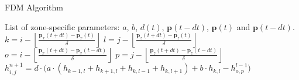 \begin{algorithm}
\caption{FDM Algorithm}
\label{alg:fdm_compute}
\begin{algorithmic}[1]
\Require List of zone-specific parameters: $a$, $b$, $d(t)$, $\mathbf{p}(t-dt)$, $\mathbf{p}(t)$ and $\mathbf{p}(t-dt)$.
    \State $k = i - \left\lfloor\frac{\mathbf{p}_x(t+dt)-\mathbf{p}_x(t)}{\delta}\right\rfloor$
    \State $l = j - \left\lfloor\frac{\mathbf{p}_z(t+dt)-\mathbf{p}_z(t)}{\delta}\right\rfloor $
    \State $o = i - \left\lfloor\frac{\mathbf{p}_x(t+dt)-\mathbf{p}_x(t-dt)}{\delta}\right\rfloor$
    \State $p = j - \left\lfloor\frac{\mathbf{p}_z(t+dt)-\mathbf{p}_z(t-dt)}{\delta}\right\rfloor$
    \State $h_{i,j}^{n+1} = d \cdot \big(a \cdot (h_{k-1,l} + h_{k+1,l} + h_{k,l-1} + h_{k,l+1})+ b \cdot h_{k,l} - h_{o,p}^{l-1} \big)$
\EndFor
\end{algorithmic}
\end{algorithm}
